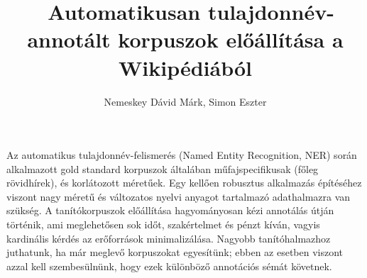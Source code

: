 \documentclass{llncs}
\begin{document}
\pagestyle{myheadings}
\def\leftmark{{\rm IX. Magyar Sz\'am\'\i t\'og\'epes Nyelv\'eszeti Konferencia}}
\def\rightmark{{\rm Szeged, 2013. január 7-8.}}

\setcounter{page}{3}

\title{\ \break Automatikusan tulajdonnév-annotált korpuszok előállítása a Wikipédiából}
\author{Nemeskey Dávid Márk, Simon Eszter}

\maketitle




Az automatikus tulajdonnév-felismerés (Named Entity Recognition, NER) során alkalmazott
gold standard korpuszok általában műfajspecifikusak (főleg rövidhírek), és korlátozott
méretűek. Egy kellően robusztus alkalmazás építéséhez viszont nagy méretű és változatos
nyelvi anyagot tartalmazó adathalmazra van szükség. A tanítókorpuszok előállítása
hagyományosan kézi annotálás útján tör\-té\-nik, ami meglehetősen sok időt, szakértelmet és
pénzt kíván, vagyis kardinális kérdés az erőforrások minimalizálása. Nagyobb
tanítóhalmazhoz juthatunk, ha már meglevő korpuszokat egyesítünk; ebben az esetben
viszont azzal kell szembesülnünk, hogy ezek különböző annotációs sémát követnek. 
\end{document}
